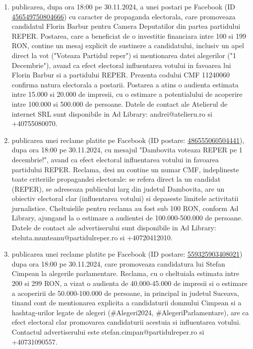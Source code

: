 \documentclass[a4paper,12pt]{article}
\begin{document}
\begin{enumerate}[leftmargin=*, label=\arabic*.)]
    \item publicarea, dupa ora 18:00 pe 30.11.2024, a unei postari pe Facebook (ID \href{https://www.facebook.com/ads/library/?id=456549750804666}{456549750804666}) cu caracter de propaganda electorala, care promoveaza candidatul Florin Barbur pentru Camera Deputatilor din partea partidului REPER. Postarea, care a beneficiat de o investitie financiara intre 100 si 199 RON,  contine un mesaj explicit de sustinere a candidatului, inclusiv un apel direct la vot ("Voteaza Partidul reper") si mentionarea datei alegerilor ("1 Decembrie"), avand ca efect electoral influentarea votului in favoarea lui Florin Barbur si a partidului REPER.  Prezenta codului CMF 11240060 confirma natura electorala a postarii.  Postarea a atins o audienta estimata intre 15.000 si 20.000 de impresii, cu o estimare a potentialului de acoperire intre 100.000 si 500.000 de persoane.  Datele de contact ale Atelierul de internet SRL sunt disponibile in Ad Library: andrei@atelieru.ro si +40755080070.
    \item publicarea unei reclame platite pe Facebook (ID postare: \href{https://www.facebook.com/ads/library/?id=486555060504441}{486555060504441}), dupa ora 18:00 pe 30.11.2024, cu mesajul "Dambovita voteaza REPER pe 1 decembrie!",  avand ca efect electoral influentarea votului in favoarea partidului REPER.  Reclama, desi nu contine un numar CMF, indeplineste toate criteriile propagandei electorale: se refera direct la un candidat (REPER), se adreseaza publicului larg din judetul Dambovita, are un obiectiv electoral clar (influentarea votului) si depaseste limitele activitatii jurnalistice.  Cheltuielile pentru reclama au fost sub 100 RON, conform Ad Library,  ajungand la o estimare a audientei de 100.000-500.000 de persoane.  Datele de contact ale advertiserului sunt disponibile in Ad Library: steluta.munteanu@partidulreper.ro si +40720412010.
    \item publicarea unei reclame platite pe Facebook (ID postare: \href{https://www.facebook.com/ads/library/?id=559325903408021}{559325903408021}) dupa ora 18:00 pe 30.11.2024, care promoveaza candidatura lui Stefan Cimpean la alegerile parlamentare. Reclama, cu o cheltuiala estimata intre 200 si 299 RON,  a vizat o audienta de 40.000-45.000 de impresii si o estimare a acoperirii de 50.000-100.000 de persoane, in principal in judetul Suceava,  tinand cont de mentionarea explicita a candidaturii domnului Cimpean si a hashtag-urilor legate de alegeri (\#Alegeri2024, \#AlegeriParlamentare), are ca efect electoral clar promovarea candidaturii acestuia si influentarea votului.  Contactul advertiserului este stefan.cimpan@partidulreper.ro si +40731090557.

\end{enumerate}
\end{document}
